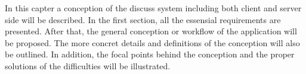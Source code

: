 In this capter a conception of the discuss system including both client and server side will be described. In the first section, all the essensial requirements are presented. After that, the general conception or workflow of the application will be proposed. The more concret details and definitions of the conception will also be outlined. In addition, the focal points behind the conception and the proper solutions of the difficulties will be illustrated.

